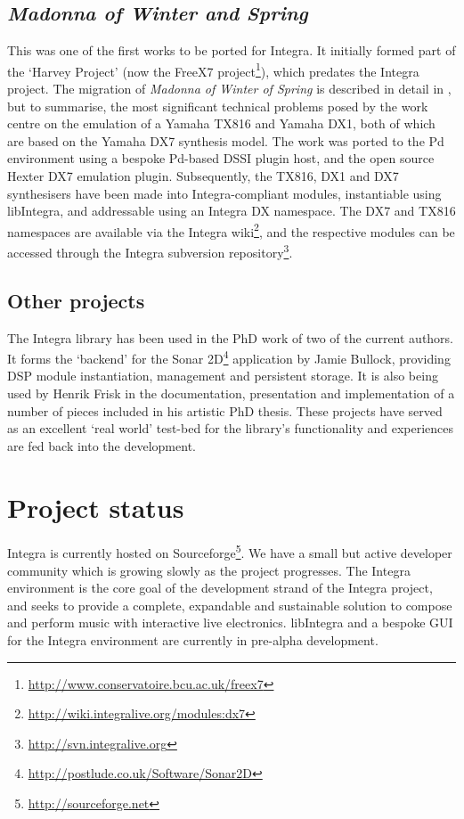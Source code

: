\documentclass[10pt,journal,final]{IEEEtran}
\begin{document}
\subsection{{\it Madonna of Winter and Spring}}\label{subsec:madonna}
This was one of the first works to be ported for Integra. It initially formed part of the `Harvey Project' (now the FreeX7 project\footnote{\url{http://www.conservatoire.bcu.ac.uk/freex7}}), which predates the Integra project. The migration of {\it Madonna of Winter of Spring} is described in detail in \cite{BullockCoccioli:01}, but to summarise, the most significant technical problems posed by the work centre on the emulation of a Yamaha TX816 and Yamaha DX1, both of which are based on the Yamaha DX7 synthesis model. The work was ported to the Pd environment using a bespoke Pd-based DSSI plugin host, and the open source Hexter DX7 emulation plugin. Subsequently, the TX816, DX1 and DX7 synthesisers have been made into Integra-compliant modules, instantiable using libIntegra, and addressable using an Integra DX namespace. The DX7 and TX816 namespaces are available via the Integra wiki\footnote{\url{http://wiki.integralive.org/modules:dx7}}, and the respective modules can be accessed through the Integra subversion repository\footnote{\url{http://svn.integralive.org}}.

\subsection{Other projects}\label{subsec:other_projects}
The Integra library has been used in the PhD work of two of the current authors. It forms the `backend' for the Sonar 2D\footnote{\url{http://postlude.co.uk/Software/Sonar2D}} application by Jamie Bullock, providing DSP module instantiation, management and persistent storage. It is also being used by Henrik Frisk in the documentation, presentation and implementation of a number of pieces included in his artistic PhD thesis. These projects have served as an excellent `real world' test-bed for the library's functionality and experiences are fed back into the development.

\section{Project status}\label{sec:status}

Integra is currently hosted on Sourceforge\footnote{\url{http://sourceforge.net}}. We have a small but active developer community which is growing slowly as the project progresses. The Integra environment is the core goal of the development strand of the Integra project, and seeks to provide a complete, expandable and sustainable solution to compose and perform music with interactive live electronics.
libIntegra and a bespoke GUI for the Integra environment are currently in pre-alpha development.
 
\end{document}
